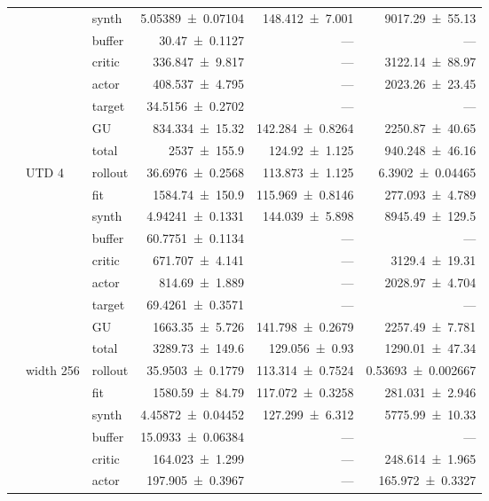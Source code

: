 {\begin{longtable}{@{}lllrrr@{}}
     &  & synth & \num{5.05389+-0.07104} & \num{148.412+-7.001} & \num{9017.29+-55.13} \\
     &  & buffer & \num{30.47+-0.1127} & --- & --- \\
     &  & critic & \num{336.847+-9.817} & --- & \num{3122.14+-88.97} \\
     &  & actor & \num{408.537+-4.795} & --- & \num{2023.26+-23.45} \\
     &  & target & \num{34.5156+-0.2702} & --- & --- \\
     &  & GU & \num{834.334+-15.32} & \num{142.284+-0.8264} & \num{2250.87+-40.65} \\
     &  & total & \num{2537+-155.9} & \num{124.92+-1.125} & \num{940.248+-46.16} \\
    \addlinespace[2pt]
     & UTD 4 & rollout & \num{36.6976+-0.2568} & \num{113.873+-1.125} & \num{6.3902+-0.04465} \\
     &  & fit & \num{1584.74+-150.9} & \num{115.969+-0.8146} & \num{277.093+-4.789} \\
     &  & synth & \num{4.94241+-0.1331} & \num{144.039+-5.898} & \num{8945.49+-129.5} \\
     &  & buffer & \num{60.7751+-0.1134} & --- & --- \\
     &  & critic & \num{671.707+-4.141} & --- & \num{3129.4+-19.31} \\
     &  & actor & \num{814.69+-1.889} & --- & \num{2028.97+-4.704} \\
     &  & target & \num{69.4261+-0.3571} & --- & --- \\
     &  & GU & \num{1663.35+-5.726} & \num{141.798+-0.2679} & \num{2257.49+-7.781} \\
     &  & total & \num{3289.73+-149.6} & \num{129.056+-0.93} & \num{1290.01+-47.34} \\
    \addlinespace[2pt]
     & width 256 & rollout & \num{35.9503+-0.1779} & \num{113.314+-0.7524} & \num{0.53693+-0.002667} \\
     &  & fit & \num{1580.59+-84.79} & \num{117.072+-0.3258} & \num{281.031+-2.946} \\
     &  & synth & \num{4.45872+-0.04452} & \num{127.299+-6.312} & \num{5775.99+-10.33} \\
     &  & buffer & \num{15.0933+-0.06384} & --- & --- \\
     &  & critic & \num{164.023+-1.299} & --- & \num{248.614+-1.965} \\
     &  & actor & \num{197.905+-0.3967} & --- & \num{165.972+-0.3327} \\

\end{longtable}}
